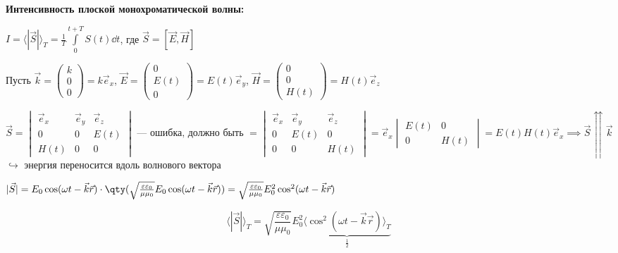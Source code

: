 \begin{nb}
	\textbf{Интенсивность плоской монохроматической волны:}
\end{nb}
$I = \langle |\vec{S}| \rangle_T = \frac{1}{T} \int\limits_0^{t+T} S(t) \dd t$, где $\vec{S} = [\vec{E}, \vec{H}]$

Пусть $\vec{k} = \begin{pmatrix} k \\ 0 \\ 0 \end{pmatrix} = k \vec{e}_x$, $\vec{E} = \begin{pmatrix} 0 \\ E(t) \\ 0 \end{pmatrix} = E(t) \vec{e}_y$, $\vec{H} = \begin{pmatrix} 0 \\ 0 \\ H(t) \end{pmatrix} = H(t) \vec{e}_z$

\begin{equation*}
	\vec{S} = \begin{vmatrix} 
		\vec{e}_x & \vec{e}_y & \vec{e}_z \\ 
		0 & 0 & E(t) \\ 
		H(t) & 0 & 0 
	\end{vmatrix} \text{ --- ошибка, должно быть } 
	= \begin{vmatrix} 
		\vec{e}_x & \vec{e}_y & \vec{e}_z \\ 
		0 & E(t) & 0 \\ 
		0 & 0 & H(t) 
	\end{vmatrix}
	= \vec{e}_x \begin{vmatrix} 
		E(t) & 0 \\ 
		0 & H(t) 
	\end{vmatrix} = E(t)H(t)\vec{e}_x \implies \vec{S} \upuparrows \vec{k}
\end{equation*}
$\hookrightarrow$ энергия переносится вдоль волнового вектора

$|\vec{S}| = E_0 \cos(\omega t - \vec{k}\vec{r}) \cdot \qty( \sqrt{\frac{\varepsilon\varepsilon_0}{\mu\mu_0}} E_0 \cos(\omega t - \vec{k}\vec{r}) ) = \sqrt{\frac{\varepsilon\varepsilon_0}{\mu\mu_0}} E_0^2 \cos^2(\omega t - \vec{k}\vec{r})$

\newpage

\begin{equation*}
	\langle |\vec{S}| \rangle_T = \sqrt{\frac{\varepsilon\varepsilon_0}{\mu\mu_0}} E_0^2 \underbrace{\langle \cos^2(\omega t - \vec{k}\vec{r}) \rangle_T}_{\frac{1}{2}}
\end{equation*}

